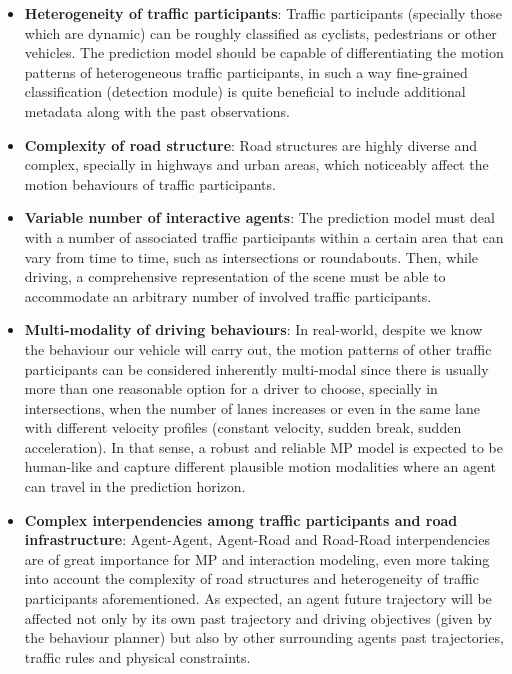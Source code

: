 \begin{itemize}
	
	\item \textbf{Heterogeneity of traffic participants}: Traffic participants (specially those which are dynamic) can be roughly classified as cyclists, pedestrians or other vehicles. The prediction model should be capable of differentiating the motion patterns of heterogeneous traffic participants, in such a way fine-grained classification (detection module) is quite beneficial to include additional metadata along with the past observations.
	
	\item \textbf{Complexity of road structure}: Road structures are highly diverse and complex, specially in highways and urban areas, which noticeably affect the motion behaviours of traffic participants.
	
	\item \textbf{Variable number of interactive agents}: The prediction model must deal with a number of associated traffic participants within a certain area that can vary from time to time, such as intersections or roundabouts. Then, while driving, a comprehensive representation of the scene must be able to accommodate an arbitrary number of involved traffic participants.
	
	\item \textbf{Multi-modality of driving behaviours}: In real-world, despite we know the behaviour our vehicle will carry out, the motion patterns of other traffic participants can be considered inherently multi-modal since there is usually more than one reasonable option for a driver to choose, specially in intersections, when the number of lanes increases or even in the same lane with different velocity profiles (constant velocity, sudden break, sudden acceleration). In that sense, a robust and reliable \ac{MP} model is expected to be human-like and capture different plausible motion modalities where an agent can travel in the prediction horizon.
	
	\item \textbf{Complex interpendencies among traffic participants and road infrastructure}: Agent-Agent, Agent-Road and Road-Road interpendencies are of great importance for \ac{MP} and interaction modeling, even more taking into account the complexity of road structures and heterogeneity of traffic participants aforementioned. As expected, an agent future trajectory will be affected not only by its own past trajectory and driving objectives (given by the behaviour planner) but also by other surrounding agents past trajectories, traffic rules and physical constraints.
	
\end{itemize}


